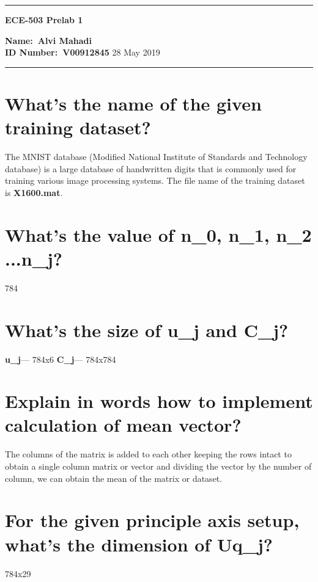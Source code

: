 \documentclass[11pt,a4paper,twoside]{article}
\begin{document}
\begin{center}
\hrule

\vspace{.4cm}
{\bf {\Huge ECE-503 Prelab 1}}
\vspace{.2cm}
\end{center}
{\bf Name:\ Alvi Mahadi }  \\
{\bf ID Number:\ V00912845} \hspace{\fill} 28 May 2019 \\
\hrule


\section{What's the name of the given training dataset?}
The MNIST database (Modified National Institute of Standards and Technology database) is a large database of handwritten digits that is commonly used for training various image processing systems. The file name of the training dataset is \textbf{X1600.mat}.
\section{What's the value of n\_0, n\_1, n\_2 ...n\_j?}
784
\section{What's the size of u\_j and C\_j?}
\noindent\textbf{u\_j}--- 784x6
\noindent\textbf{C\_j}--- 784x784
\section{Explain in words how to implement calculation of mean vector?}
The columns of the matrix is added to each other keeping the rows intact to obtain a single column matrix or vector and dividing the vector by the number of column, we can obtain the mean of the matrix or dataset.
\section{For the given principle axis setup, what's the dimension of Uq\_j?} 
784x29
\end{document}
